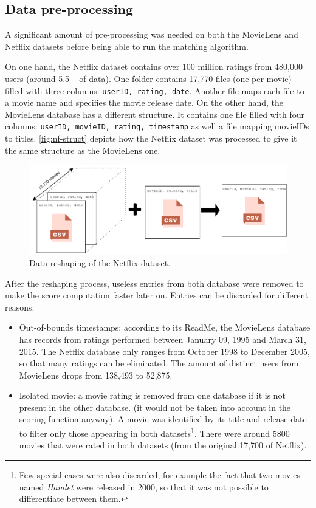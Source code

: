\subsection{Data pre-processing}

A significant amount of pre-processing was needed on both the MovieLens and Netflix datasets before being able to run the matching algorithm. 

On one hand, the Netflix dataset contains over 100 million ratings from 480,000 users (around 5.5 \si{\giga\byte} of data). One folder contains 17,770 files (one per movie) filled with three columns: \texttt{userID, rating, date}. Another file maps each file to a movie name and specifies the movie release date. On the other hand, the MovieLens database has a different structure. It contains one file filled with four columns: \texttt{userID, movieID, rating, timestamp} as well a file mapping movieIDs to titles. \autoref{fig:nf-struct} depicts how the Netflix dataset was processed to give it the same structure as the MovieLens one.

\begin{figure}[h]
	\centering
	\includegraphics[width=\linewidth]{img/processing.pdf}
	\caption{Data reshaping of the Netflix dataset.}
	\label{fig:nf-struct}
\end{figure}

After the reshaping process, useless entries from both database were removed to make the score computation faster later on. Entries can be discarded for different reasons:

\begin{itemize}
	\item Out-of-bounds timestamps: according to its ReadMe, the MovieLens database has records from ratings performed between January 09, 1995 and March 31, 2015. The Netflix database only ranges from October 1998 to December 2005, so that many ratings can be eliminated. The amount of distinct users from MovieLens drops from 138,493 to 52,875.
	
	\item Isolated movie: a movie rating is removed from one database if it is not present in the other database. (it would not be taken into account in the scoring function anyway). A movie was identified by its title and release date to filter only those appearing in both datasets\footnote{Few special cases were also discarded, for example the fact that two movies named \textit{Hamlet} were released in 2000, so that it was not possible to differentiate between them.}. There were around 5800 movies that were rated in both datasets (from the original 17,700 of Netflix).
\end{itemize}

